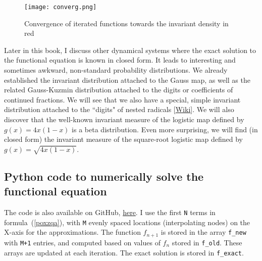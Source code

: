 \documentclass[oneside,10pt]{book}
\begin{document}
\begin{figure}[H]
\centering
\texttt{[image: converg.png]}  %
\caption{Convergence of iterated functions towards the invariant density in red}
\label{fig:diagcvg}
\end{figure}

Later in this book, I discuss other dynamical systems where the exact solution to the functional equation is known in closed form. It leads to interesting and sometimes awkward,
 non-standard probability distributions. We already established the invariant distribution attached to the Gauss map, as well as the
 related \textcolor{index}{Gauss-Kuzmin distribution}  attached to the digits or coefficients of continued fractions.  We will see that we also have a special, simple invariant distribution attached
 to the ``digits" of \textcolor{index}{nested radicals} [\href{https://en.wikipedia.org/wiki/Nested_radical}{Wiki}]. We will also discover that the well-known invariant measure of the
\textcolor{index}{logistic map} defined by $g(x)=4x(1-x)$ is
 a \textcolor{index}{beta distribution}. Even more surprising, we will find (in closed form) the invariant measure of the square-root logistic map
 defined by $g(x) =\sqrt{4x(1-x)}$.

\subsection{Python code to numerically solve the functional equation}\label{pawqsx}

The code is also available on GitHub, \href{https://github.com/VincentGranville/Stochastic-Processes/blob/master/chaos_solveFunctional.py}{here}. I use the first \texttt{N} terms in formula~(\ref{poxzqa}), with \texttt{M} evenly spaced locations (interpolating nodes) on the X-axis for the
 approximations. The function $f_{n+1}$ is stored in the array \texttt{f\_new} with \texttt{M+1} entries, and computed based on values of
 $f_{n}$ stored in \texttt{f\_old}. These arrays are updated at each iteration. The exact solution is stored in \texttt{f\_exact}.
\vspace{1ex}
\end{document}

